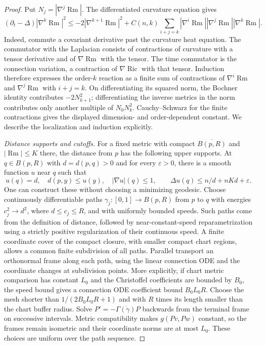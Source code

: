 \begin{proof}
Put $N_j=|\nabla^j\operatorname{Rm}|$.  The differentiated curvature equation
gives
\[
 (\partial_t-\Delta)|\nabla^k\operatorname{Rm}|^2
 \leq-2|\nabla^{k+1}\operatorname{Rm}|^2+
 C(n,k)\sum_{i+j=k}|\nabla^i\operatorname{Rm}|
                      |\nabla^j\operatorname{Rm}|
                      |\nabla^k\operatorname{Rm}|.
\]
Indeed, commute a covariant derivative past the curvature heat equation.
The commutator with the Laplacian consists of contractions of curvature
with a tensor derivative and of $\nabla\operatorname{Rm}$ with the tensor.
The time commutator is the connection variation, a contraction of
$\nabla\operatorname{Ric}$ with that tensor.  Induction therefore
expresses the order-$k$ reaction as a finite sum of contractions of
$\nabla^i\operatorname{Rm}$ and $\nabla^j\operatorname{Rm}$ with $i+j=k$.
On differentiating its squared norm, the Bochner identity contributes
$-2N_{k+1}^2$; differentiating the inverse metrics in the norm contributes
only another multiple of $N_0N_k^2$.  Cauchy--Schwarz for the finite
contractions gives the displayed dimension- and order-dependent constant.
We describe the localization and induction explicitly.

\emph{Distance supports and cutoffs.}
For a fixed metric with compact $\overline{B(p,R)}$ and $|\operatorname{Rm}|
\leq K$ there, the distance from $p$ has the following upper supports.
At $q\in B(p,R)$ with $d=d(p,q)>0$ and for every $\varepsilon>0$, there
is a smooth function $u$ near $q$ such that
\begin{equation}\label{eq:rf-shi-distance-support}
 u(q)=d,\quad d(p,y)\leq u(y),\quad |\nabla u|(q)\leq1,
 \qquad \Delta u(q)\leq n/d+nKd+\varepsilon.
\end{equation}
One can construct these without choosing a minimizing geodesic.  Choose
continuously differentiable paths $\gamma_j:[0,1]\to B(p,R)$ from $p$ to $q$ with energies
$c_j^2\to d^2$, where $d\leq c_j\leq R$, and with uniformly bounded
speeds.  Such paths come from the definition of distance, followed by
near-constant-speed reparametrization using a strictly positive
regularization of their continuous speed.  A finite coordinate cover
of the compact closure, with smaller compact chart regions, allows a
common finite subdivision of all paths.  Parallel transport an
orthonormal frame along each path, using the linear connection ODE
and the coordinate changes at subdivision points.  More explicitly,
if chart metric comparison has constant $L_0$ and the Christoffel
coefficients are bounded by $B_0$, the speed bound gives a connection
ODE coefficient bound $B_0L_0R$.  Choose the mesh shorter than
$1/(2B_0L_0R+1)$ and with $R$ times its length smaller than the chart
buffer radius.  Solve $P'=-\Gamma(\dot\gamma)P$ backwards from the
terminal frame on successive intervals.  Metric compatibility makes
$g(Pv,Pw)$ constant, so the frames remain isometric and their coordinate
norms are at most $L_0$.  These choices are uniform over the path sequence.


\end{proof}
